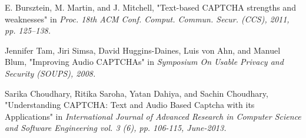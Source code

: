 \begin{thebibliography}{9}
 E. Bursztein, M. Martin, and J. Mitchell, "Text-based CAPTCHA strengths and weaknesses" in \emph{Proc. 18th ACM Conf. Comput. Commun. Secur. (CCS), 2011, pp. 125–138.}

 Jennifer Tam, Jiri Simsa, David Huggins-Daines, Luis von Ahn, and Manuel Blum, "Improving Audio CAPTCHAs" in \emph{Symposium On Usable Privacy and Security (SOUPS), 2008.}

 Sarika Choudhary, Ritika Saroha, Yatan Dahiya, and Sachin Choudhary, "Understanding CAPTCHA: Text and Audio Based Captcha with its Applications" in \emph{International Journal of Advanced Research in Computer Science and Software Engineering vol. 3 (6), pp. 106-115, June-2013.}

\end{thebibliography}